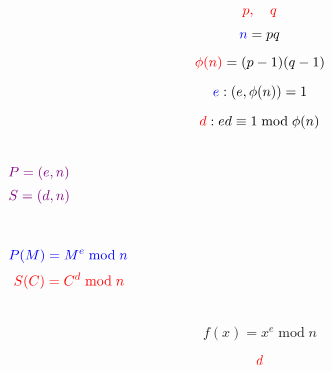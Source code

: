 
\begin{frame}

  \pause
  \begin{quote}
	\centering
  \end{quote}
\end{frame}

\begin{frame}
  \begin{center}
	 \\
  \end{center}

  \begin{columns}
	  \pause
	  \pause
  \end{columns}
\end{frame}

\begin{frame}
  \[
	\textcolor{red}{p,\quad q}
  \]

  \pause
  \[
	\textcolor{blue}{n} = p q
  \]

  \pause
  \[
	\textcolor{red}{\phi(n)} = (p - 1) (q - 1)
  \]

  \pause
  \[
	\textcolor{blue}{e} : (e, \phi(n)) = 1
  \]

  \pause
  \[
	\textcolor{red}{d} : ed \equiv 1 \;\text{mod}\; \phi(n)
  \]

  \begin{columns}
	  \pause
	  \[
		\textcolor{violet}{P = (e, n)}
	  \]
	  \pause
	  \[
		\textcolor{violet}{S = (d, n)}
	  \]
  \end{columns}

  \vspace{0.40cm}
  \begin{columns}
	  \pause
	  \[
		\textcolor{blue}{P(M) = M^{e} \;\text{mod}\; n}
	  \]
	  \pause
	  \[
		\textcolor{red}{S(C) = C^{d} \;\text{mod}\; n}
	  \]
  \end{columns}
\end{frame}

\begin{frame}
  \begin{center}
  \end{center}


  \pause
  \[
	f(x) = x^{e} \;\text{mod}\; n
  \]

  \pause
  \[
	\textcolor{red}{d}
  \]
\end{frame}

